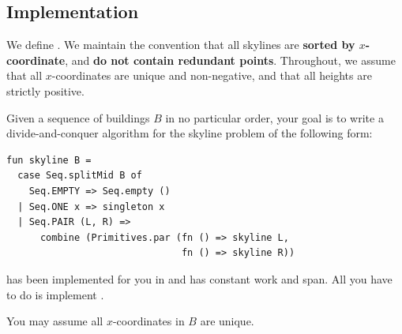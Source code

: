 \subsection{Implementation}
\begin{gram}
We define . We maintain the convention
that all skylines are \textbf{sorted by $x$-coordinate}, and \textbf{do not
contain redundant points}. Throughout, we assume that all $x$-coordinates are
unique and non-negative, and that all heights are strictly positive.
\end{gram}

\begin{gram}
Given a sequence of buildings $B$ in no particular order, your goal is to write
a divide-and-conquer algorithm for the skyline problem of the following form:
\begin{verbatim}
fun skyline B =
  case Seq.splitMid B of
    Seq.EMPTY => Seq.empty ()
  | Seq.ONE x => singleton x
  | Seq.PAIR (L, R) =>
      combine (Primitives.par (fn () => skyline L,
                               fn () => skyline R))
\end{verbatim}
 has been implemented for you in  and has
constant work and span. All you have to do is implement .
\end{gram}

\begin{note}
You may assume all $x$-coordinates in $B$ are unique.
\end{note}

